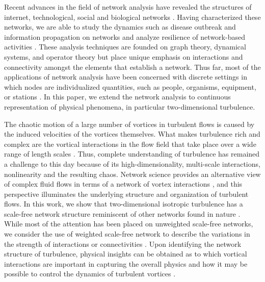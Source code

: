 \documentclass{jfm}
\begin{document}
Recent advances in the field of network analysis have revealed the structures of internet, technological, social and biological networks \citep{Albert:RMP02, Newman:SIAMReview03, Barrat:PNAS04, Newman10}.  Having characterized these networks, we are able to study the dynamics such as disease outbreak and information propagation on networks and analyze resilience of network-based activities \citep{Barrat08, Albert:Nature00}.  These analysis techniques are founded on graph theory, dynamical systems, and operator theory but place unique emphasis on interactions and connectivity amongst the elements that establish a network.  Thus far, most of the applications of network analysis have been concerned with discrete settings in which nodes are individualized quantities, such as people, organisms, equipment, or stations \citep{Caldarelli07, Newman10}.  In this paper, we extend the network analysis to continuous representation of physical phenomena, in particular two-dimensional turbulence.

The chaotic motion of a large number of vortices in turbulent flows is caused by the induced velocities of the vortices themselves.  What makes turbulence rich and complex are the vortical interactions in the flow field that take place over a wide range of length scales \citep{Tennekes72, Hinze75, Frisch95, Pope00, davidson2004turbulence, Lesieur08}. Thus, complete understanding of turbulence has remained a challenge to this day because of its high-dimensionality, multi-scale interactions, nonlinearity and the resulting chaos.  Network science provides an alternative view of complex fluid flows in terms of a network of vortex interactions \citep{Nair:JFM15}, and this perspective illuminates the underlying structure and organization of turbulent flows.  In this work, we show that two-dimensional isotropic turbulence \citep{Kraichnan:RPP80, McWilliams:JFM84, Benzi:PRA90, Benzi:PF92, davidson2004turbulence, Boffetta:ARFM12} has a scale-free network structure reminiscent of other networks found in nature \citep{Barabasi:Science99, Caldarelli07}.  While most of the attention has been placed on unweighted scale-free networks, we consider the use of weighted scale-free network to describe the variations in the strength of interactions or connectivities \citep{Barrat:PRL04}.   Upon identifying the network structure of turbulence, physical insights can be obtained as to which vortical interactions are important in capturing the overall physics and how it may be possible to control the dynamics of turbulent vortices \citep{Liu:Nature11, Farazmand:JFM11, Brunton:AMR15}.
\end{document}
